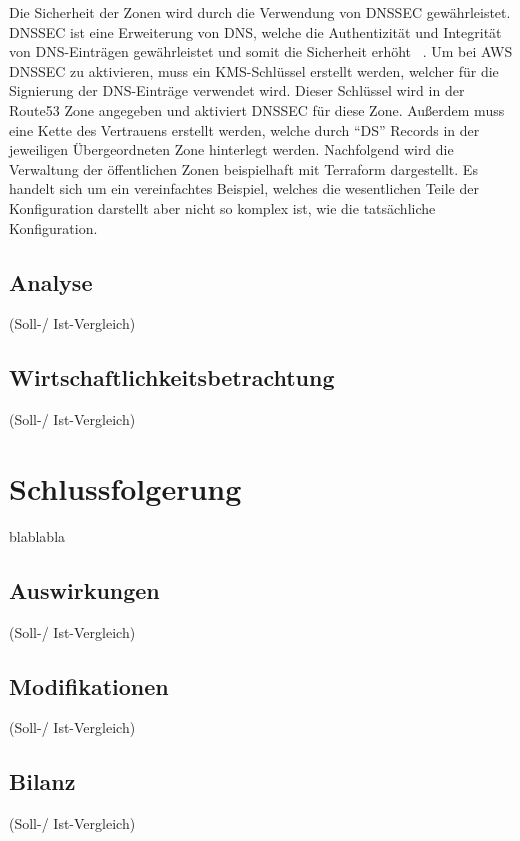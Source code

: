 Die Sicherheit der Zonen wird durch die Verwendung von \ac{DNSSEC} gewährleistet.
DNSSEC ist eine Erweiterung von DNS, welche die Authentizität und Integrität von DNS-Einträgen gewährleistet und somit die Sicherheit erhöht ~\cite{kelm2001sicherheit}.
Um bei AWS DNSSEC zu aktivieren, muss ein KMS-Schlüssel erstellt werden, welcher für die Signierung der DNS-Einträge verwendet wird.
Dieser Schlüssel wird in der Route53 Zone angegeben und aktiviert DNSSEC für diese Zone.
Außerdem muss eine Kette des Vertrauens erstellt werden, welche durch \enquote{DS} Records in der jeweiligen Übergeordneten Zone hinterlegt werden.
Nachfolgend wird die Verwaltung der öffentlichen Zonen beispielhaft mit Terraform dargestellt.
Es handelt sich um ein vereinfachtes Beispiel, welches die wesentlichen Teile der Konfiguration darstellt aber nicht so komplex ist, wie die tatsächliche Konfiguration.
\medskip



\subsection{Analyse}
\label{subsec:description:analyse}
(Soll-/ Ist-Vergleich)

\subsection{Wirtschaftlichkeitsbetrachtung}
\label{subsec:description:ergebnisse:wirtschaftlichkeitsbetrachtung}
(Soll-/ Ist-Vergleich)

\section{Schlussfolgerung}
\label{sec:description:schlussfolgerung}
blablabla

\subsection{Auswirkungen}
\label{subsec:description:auswirkungen}
(Soll-/ Ist-Vergleich)

\subsection{Modifikationen}
\label{subsec:description:modifikationen}
(Soll-/ Ist-Vergleich)

\subsection{Bilanz}
\label{subsec:description:bilanz}
(Soll-/ Ist-Vergleich)
